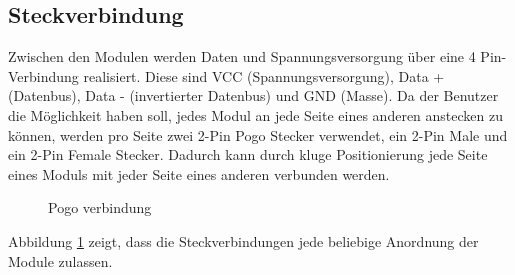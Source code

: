 \subsection{Steckverbindung}
Zwischen den Modulen werden Daten und Spannungsversorgung über eine 4 Pin-Verbindung realisiert. Diese sind VCC (Spannungsversorgung), Data + (Datenbus), Data - (invertierter Datenbus) und GND (Masse). Da der Benutzer die Möglichkeit haben soll, jedes Modul an jede Seite eines anderen anstecken zu können, werden pro Seite zwei 2-Pin Pogo Stecker verwendet, ein 2-Pin Male und ein 2-Pin Female Stecker. Dadurch kann durch kluge Positionierung jede Seite eines Moduls mit jeder Seite eines anderen verbunden werden.
\begin{figure}[H]
    \centering    
    \caption{Pogo verbindung}
    \label{pogo_verbindung}
\end{figure}
 \noindent Abbildung \ref{pogo_verbindung} zeigt, dass die Steckverbindungen jede beliebige Anordnung der Module zulassen.